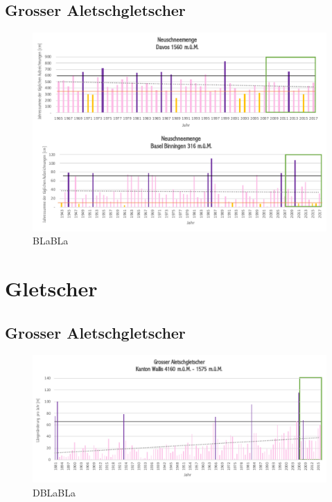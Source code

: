 \begin{refsection}
\subsection{Grosser Aletschgletscher}


\begin{figure}[htbp]
\centering
\includegraphics[width=1.0\textwidth]{extrem/Neuschnee.pdf}
\caption{BLaBLa}
\label{Neuschnee}
\end{figure}


\section{Gletscher}


\subsection{Grosser Aletschgletscher}

\begin{figure}[htbp]
\centering
\includegraphics[width=1.0\textwidth]{extrem/Aletsch.pdf}
\caption{DBLaBLa}
\label{AletschTab}
\end{figure}



\end{refsection}
